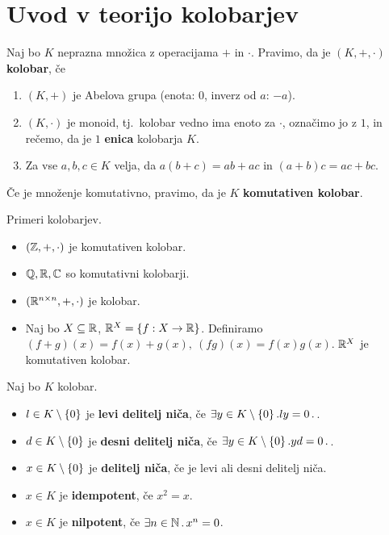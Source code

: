 \section{Uvod v teorijo kolobarjev}

\begin{definicija}
    Naj bo $K$ neprazna množica z operacijama $+$ in $\cdot$. Pravimo, da je $(K, +, \cdot)$ \textbf{kolobar}, če
    \begin{enumerate}
        \item $(K, +)$ je Abelova grupa (enota: $0$, inverz od $a$: $-a$).
        \item $(K, \cdot)$ je monoid, tj.\ kolobar vedno ima enoto za $\cdot$, označimo jo z $1$, in rečemo, da je $1$ \textbf{enica} kolobarja $K$.
        \item Za vse $a, b, c \in K$ velja, da $a(b+c) = ab+ac$ in $(a+b)c = ac+bc$.
    \end{enumerate}
    Če je množenje komutativno, pravimo, da je $K$ \textbf{komutativen kolobar}.
\end{definicija}

\begin{zgled}
    Primeri kolobarjev.
    \begin{itemize}
        \item $(\mathbb{Z}, +, \cdot)$ je komutativen kolobar.
        \item $\mathbb{Q}, \mathbb{R}, \mathbb{C}$ so komutativni kolobarji.
        \item $(\mathbb{R}^{n \times n}, +, \cdot)$ je kolobar.
        \item Naj bo $X \subseteq \mathbb{R}$, $\mathbb{R}^X = \left\{f: X \to \mathbb{R}\right\}$. Definiramo $(f+g)(x) = f(x) + g(x), \ (fg)(x) = f(x)g(x)$. $\mathbb{R}^X$ je komutativen kolobar.
    \end{itemize}
\end{zgled}

\begin{definicija}
    Naj bo $K$ kolobar.
    \begin{itemize}
        \item $l \in K \setminus \left\{0\right\}$ je \textbf{levi delitelj niča}, če $\exists y \in K \setminus \left\{0\right\}. ly = 0 \,.\,$.
        \item $d \in K \setminus \left\{0\right\}$ je \textbf{desni delitelj niča}, če $\exists y \in K \setminus \left\{0\right\}. yd = 0 \,.\,$.
        \item $x \in K \setminus \left\{0\right\}$ je \textbf{delitelj niča}, če je levi ali desni delitelj niča. 
        \item $x \in K$ je \textbf{idempotent}, če $x^2 = x$.
        \item $x \in K$ je \textbf{nilpotent}, če $\exists n \in \mathbb{N} \,.\, x^n = 0$.
    \end{itemize}
\end{definicija}

